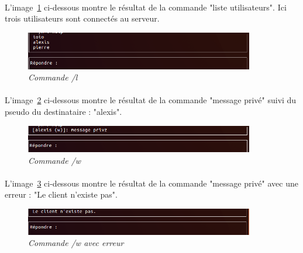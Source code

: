     \FloatBarrier
    
    \paragraph{}
    L'image~\ref{fig:cmd_liste_utilisateurs} ci-dessous montre le résultat de la commande "liste utilisateurs". Ici trois utilisateurs sont connectés au serveur.
    \begin{figure}[!htpb]
        \centering
        \includegraphics[width=10cm]{captures/cmd_liste_utilisateurs.png}
        \caption{\textit{Commande /l}}
        \label{fig:cmd_liste_utilisateurs}
    \end{figure}
    
    \FloatBarrier
    
    \paragraph{}
    L'image~\ref{fig:cmd_mp} ci-dessous montre le résultat de la commande "message privé" suivi du pseudo du destinataire : "alexis".
    \begin{figure}[!htpb]
        \centering
        \includegraphics[width=10cm]{captures/cmd_mp.png}
        \caption{\textit{Commande /w}}
        \label{fig:cmd_mp}
    \end{figure}
    
    \FloatBarrier
    
    \paragraph{}
    L'image~\ref{fig:cmd_mp_erreur} ci-dessous montre le résultat de la commande "message privé" avec une erreur : "Le client n'existe pas".
    \begin{figure}[!htpb]
        \centering
        \includegraphics[width=10cm]{captures/cmd_mp_erreur.png}
        \caption{\textit{Commande /w avec erreur}}
        \label{fig:cmd_mp_erreur}
    \end{figure}
    
